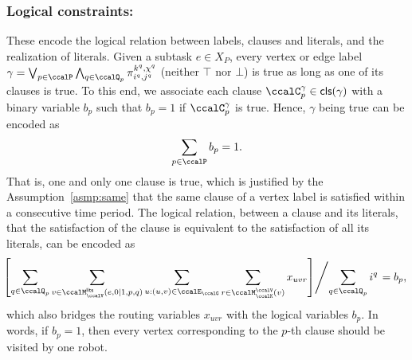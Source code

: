\documentclass[Afour,sageh,times]{sagej}
\newcommand{\clause}[1]{\mathsf{cls}(#1)}
\renewcommand{\ap}[3]{\mathcal{\pi}_{{#1},{#2}}^{#3}}
\begin{document}
{  \subsubsection{Logical constraints:}\label{sec:labelconstraints} These encode the logical relation between labels, clauses and literals, and the realization of literals.
                {Given a subtask $e\in X_P$, every vertex or edge label  $\gamma  = \bigvee_{p\in \ccalP} \bigwedge_{q\in \ccalQ_p} \ap{i^q}{j^q}{k^q,\chi^q}$ (neither $\top$ nor $\bot$) is true as long as one of its clauses is true.  To this end, we associate each clause  $\ccalC_{p}^{\gamma} \in \clause{\gamma}$ with a binary variable $b_p$ such that $b_p=1$ if $\ccalC_{p}^{\gamma}$ is true. Hence, $\gamma$ being true can be encoded as
\begingroup\makeatletter\def\f@size{10}\check@mathfonts
\def\maketag@@@#1{\hbox{\m@th\normalsize\normalfont#1}}%
\begin{align}\label{eq:c}
   \sum_{p  \in \ccalP} b_p = 1.
\end{align}
\endgroup
That is, one and only one clause is true, which is justified by the Assumption~\ref{asmp:same} that the same clause of a vertex label is satisfied within a consecutive time period. The logical relation, between a clause and its literals, that the satisfaction of the clause is equivalent to the satisfaction of all its literals, can be encoded as
\begingroup\makeatletter\def\f@size{9}\check@mathfonts
\def\maketag@@@#1{\hbox{\m@th\normalsize\normalfont#1}}%
\begin{align}
 \!\!\!  \left. \left[ \sum_{q\in \ccalQ_p} \sum_{v \in \ccalM^\mathsf{lits}_{\ccalV}(e,0|1,p,q)} \sum_{u: (u,v) \in \ccalE_\ccalG} \sum_{r\in \ccalM^\ccalV_{\ccalK}(v)} x_{uvr} \right] \middle/ {\sum_{q\in \ccalQ_p} i^q} \right.= b_p, \label{eq:6}
\end{align}
\endgroup
which also bridges the routing variables $x_{uvr}$ with the logical variables $b_p$. In words, if $b_p=1$, then every vertex corresponding to the $p$-th clause should be visited by one robot.
}}
\end{document}
